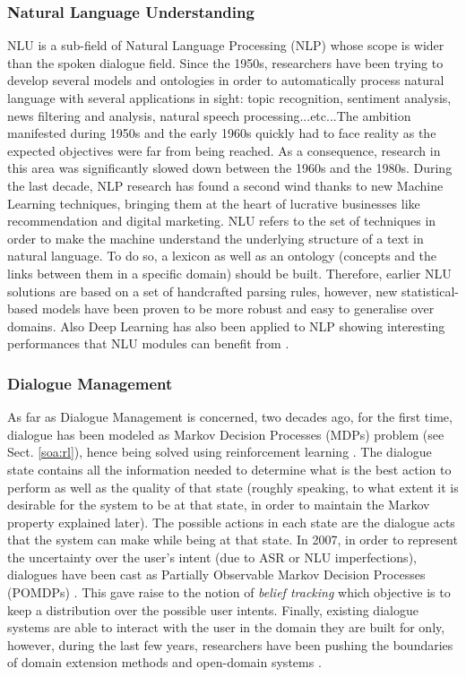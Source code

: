 		\subsubsection{Natural Language Understanding}
		
			NLU is a sub-field of Natural Language Processing (NLP) whose scope is wider than the spoken dialogue field. Since the 1950s, researchers have been trying to develop several models and ontologies in order to automatically process natural language with several applications in sight: topic recognition, sentiment analysis, news filtering and analysis, natural speech processing...etc...The ambition manifested during 1950s and the early 1960s quickly had to face reality as the expected objectives were far from being reached. As a consequence, research in this area was significantly slowed down between the 1960s and the 1980s. During the last decade, NLP research has found a second wind thanks to new Machine Learning techniques, bringing them at the heart of lucrative businesses like recommendation and digital marketing. NLU refers to the set of techniques in order to make the machine understand the underlying structure of a text in natural language. To do so, a lexicon as well as an ontology (concepts and the links between them in a specific domain) should be built. Therefore, earlier NLU solutions are based on a set of handcrafted parsing rules, however, new statistical-based models \cite{Macherey2009} have been proven to be more robust and easy to generalise over domains. Also Deep Learning has also been applied to NLP showing interesting performances that NLU modules can benefit from \cite{Bengio2003,Collobert2011}.

		\subsubsection{Dialogue Management}
		
			As far as Dialogue Management is concerned, two decades ago, for the first time, dialogue has been modeled as Markov Decision Processes (MDPs) problem (see Sect. \ref{soa:rl}), hence being solved using reinforcement learning \cite{Levin1997a}. The dialogue state contains all the information needed to determine what is the best action to perform as well as the quality of that state (roughly speaking, to what extent it is desirable for the system to be at that state, in order to maintain the Markov property explained later). The possible actions in each state are the dialogue acts that the system can make while being at that state. In 2007, in order to represent the uncertainty over the user's intent (due to ASR or NLU imperfections), dialogues have been cast as Partially Observable Markov Decision Processes (POMDPs) \cite{Williams2007}. This gave raise to the notion of \textit{belief tracking} which objective is to keep a distribution over the possible user intents. Finally, existing dialogue systems are able to interact with the user in the domain they are built for only, however, during the last few years, researchers have been pushing the boundaries of domain  extension methods \cite{Gasic2013} and open-domain systems \cite{Pakucs2003,EkeinhorKomi2014,Wang2014}.
			
